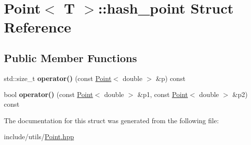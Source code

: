 \hypertarget{structPoint_1_1hash__point}{}\section{Point$<$ T $>$\+:\+:hash\+\_\+point Struct Reference}
\label{structPoint_1_1hash__point}
\subsection*{Public Member Functions}
\begin{DoxyCompactItemize}
\item 
\mbox{\label{structPoint_1_1hash__point_a7d05b1d732eaee94eb6f1b75dccf8bea}} 
std\+::size\+\_\+t {\bfseries operator()} (const \hyperlink{classPoint}{Point}$<$ double $>$ \&p) const
\item 
\mbox{\label{structPoint_1_1hash__point_a77e30ca8da99356d59cd7d45c1b56f50}} 
bool {\bfseries operator()} (const \hyperlink{classPoint}{Point}$<$ double $>$ \&p1, const \hyperlink{classPoint}{Point}$<$ double $>$ \&p2) const
\end{DoxyCompactItemize}


The documentation for this struct was generated from the following file\+:\begin{DoxyCompactItemize}
\item 
include/utils/\hyperlink{Point_8hpp}{Point.\+hpp}\end{DoxyCompactItemize}
